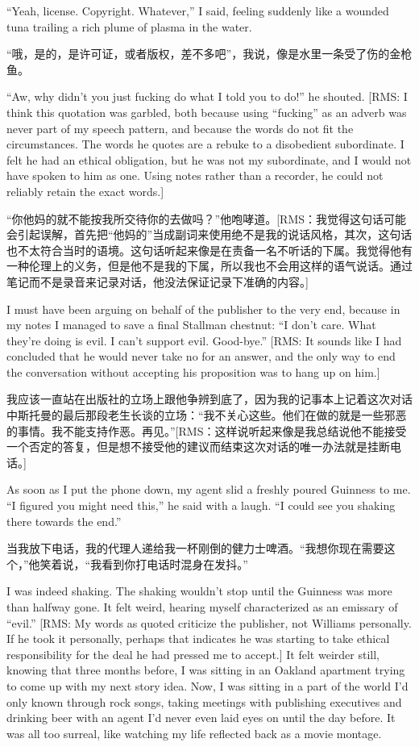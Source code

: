 \ifdefined\eng
``Yeah, license. Copyright. Whatever,'' I said, feeling suddenly like a wounded tuna trailing a rich plume of plasma in the water.
\fi

\ifdefined\chs
“哦，是的，是许可证，或者版权，差不多吧”，我说，像是水里一条受了伤的金枪鱼。
\fi

\ifdefined\eng
``Aw, why didn't you just fucking do what I told you to do!'' he shouted.  [RMS: I think this quotation was garbled, both because using ``fucking'' as an adverb was never part of my speech pattern, and because the words do not fit the circumstances.  The words he quotes are a rebuke to a disobedient subordinate.  I felt he had an ethical obligation, but he was not my subordinate, and I would not have spoken to him as one.  Using notes rather than a recorder, he could not reliably retain the exact words.]
\fi

\ifdefined\chs
“你他妈的就不能按我所交待你的去做吗？”他咆哮道。[RMS：我觉得这句话可能会引起误解，首先把“他妈的”当成副词来使用绝不是我的说话风格，其次，这句话也不太符合当时的语境。这句话听起来像是在责备一名不听话的下属。我觉得他有一种伦理上的义务，但是他不是我的下属，所以我也不会用这样的语气说话。通过笔记而不是录音来记录对话，他没法保证记录下准确的内容。]
\fi

\ifdefined\eng
I must have been arguing on behalf of the publisher to the very end, because in my notes I managed to save a final Stallman chestnut: ``I don't care. What they're doing is evil. I can't support evil. Good-bye.''  [RMS: It sounds like I had concluded that he would never take no for an answer, and the only way to end the conversation without accepting his proposition was to hang up on him.]
\fi

\ifdefined\chs
我应该一直站在出版社的立场上跟他争辨到底了，因为我的记事本上记着这次对话中斯托曼的最后那段老生长谈的立场：“我不关心这些。他们在做的就是一些邪恶的事情。我不能支持作恶。再见。”[RMS：这样说听起来像是我总结说他不能接受一个否定的答复，但是想不接受他的建议而结束这次对话的唯一办法就是挂断电话。]
\fi

\ifdefined\eng
As soon as I put the phone down, my agent slid a freshly poured Guinness to me. ``I figured you might need this,'' he said with a laugh. ``I could see you shaking there towards the end.''
\fi

\ifdefined\chs
当我放下电话，我的代理人递给我一杯刚倒的健力士啤酒。“我想你现在需要这个，”他笑着说，“我看到你打电话时混身在发抖。”
\fi

\ifdefined\eng
I was indeed shaking. The shaking wouldn't stop until the Guinness was more than halfway gone. It felt weird, hearing myself characterized as an emissary of ``evil.'' [RMS: My words as quoted criticize the publisher, not Williams personally.  If he took it personally, perhaps that indicates he was starting to take ethical responsibility for the deal he had pressed me to accept.]  It felt weirder still, knowing that three months before, I was sitting in an Oakland apartment trying to come up with my next story idea. Now, I was sitting in a part of the world I'd only known through rock songs, taking meetings with publishing executives and drinking beer with an agent I'd never even laid eyes on until the day before. It was all too surreal, like watching my life reflected back as a movie montage.
\fi

